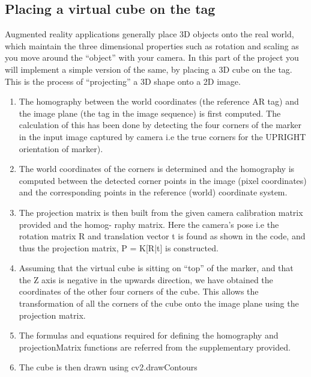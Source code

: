 \documentclass{article}
\begin{document}
\subsection{Placing a virtual cube on the tag}
Augmented reality applications generally place 3D objects onto the real world, which maintain the three
dimensional properties such as rotation and scaling as you move around the “object” with your camera. In
this part of the project you will implement a simple version of the same, by placing a 3D cube on the tag.
This is the process of “projecting” a 3D shape onto a 2D image.

\begin{enumerate}
    \item The homography between the world coordinates (the reference AR tag) and the image plane (the tag in the image sequence) is first computed. The calculation of this has been done by detecting the four corners of the marker in the input image captured by camera i.e the true corners for the UPRIGHT orientation of marker).
    \item The world coordinates of the corners is determined and the homography is computed between the detected corner points in the image (pixel coordinates) and the corresponding points in the reference (world) coordinate system.
    \item The projection matrix is then built from the given camera calibration matrix provided and the homog- raphy matrix. Here the camera’s pose i.e the rotation matrix R and translation vector t is found as shown in the code, and thus the projection matrix, P = K[R|t] is constructed.
    \item Assuming that the virtual cube is sitting on “top” of the marker, and that the Z axis is negative in the upwards direction, we have obtained the coordinates of the other four corners of the cube. This allows the transformation of all the corners of the cube onto the image plane using the projection matrix.
    \item The formulas and equations required for defining the homography and projectionMatrix functions are
referred from the supplementary provided.
    \item The cube is then drawn using cv2.drawContours
\end{enumerate}
\end{document}
